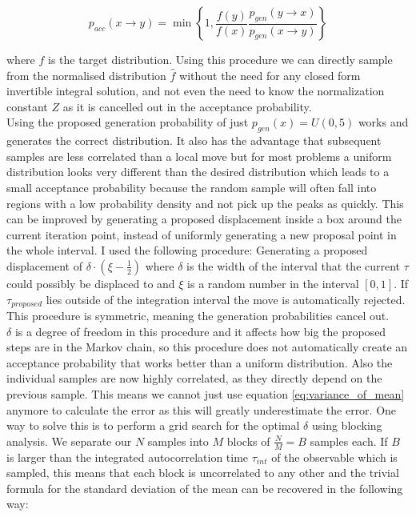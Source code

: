 \documentclass[a4paper, 11pt]{article}          %
\begin{document}
    \begin{equation}
        \label{eq:metropolis}
        p_{acc}(x\to y)= \min\left\{ 1, \frac{f(y)}{f(x)} \frac{p_{gen}(y\to x)}{p_{gen}(x\to y)} \right\}
    \end{equation}

    where $f$ is the target distribution. Using this procedure we can directly sample from the normalised distribution $\hat{f}$ without the need for any closed form invertible integral solution, and not even the need to know the normalization constant $Z$ as it is cancelled out in the acceptance probability. \\

    Using the proposed generation probability of just $p_{gen}(x)=U(0,5)$ works and generates the correct distribution. It also has the advantage that subsequent samples are less correlated than a local move but for most problems a uniform distribution looks very different than the desired distribution which leads to a small acceptance probability because the random sample will often fall into regions with a low probability density and not pick up the peaks as quickly. This can be improved by generating a proposed displacement inside a box around the current iteration point, instead of uniformly generating a new proposal point in the whole interval. I used the following procedure: Generating a proposed displacement of $\delta \cdot (\xi-\frac{1}{2})$ where $\delta$ is the width of the interval that the current $\tau$ could possibly be displaced to and $\xi$ is a random number in the interval $[0,1]$. If $\tau_{proposed}$ lies outside of the integration interval the move is automatically rejected. This procedure is symmetric, meaning the generation probabilities cancel out. \\

    $\delta$ is a degree of freedom in this procedure and it affects how big the proposed steps are in the Markov chain, so this procedure does not automatically create an acceptance probability that works better than a uniform distribution. Also the individual samples are now highly correlated, as they directly depend on the previous sample. This means we cannot just use equation \eqref{eq:variance_of_mean} anymore to calculate the error as this will greatly underestimate the error. One way to solve this is to perform a grid search for the optimal $\delta$ using blocking analysis. We separate our $N$ samples into $M$ blocks of $\frac{N}{M}=B$ samples each. If $B$ is larger than the integrated autocorrelation time $\tau_{int}$ of the observable which is sampled, this means that each block is uncorrelated to any other and the trivial formula for the standard deviation of the mean can be recovered in the following way:
\end{document}

